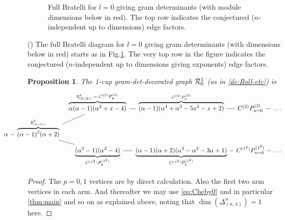 \documentclass{article}
\newcommand{\ppm}[1]{\textcolor{red}{#1}}
\newtheorem{proposition}[theorem]{Proposition}
\theoremstyle{definition}
\newcommand{\mdef}{\refstepcounter{theorem}       \medskip \noindent ({\bf \thetheorem}) }
\newcommand{\Deltaa}{\Delta}   %
\newcommand{\Deltaaa}[2]{\Deltaa^{#1}_{#2}}
\newcommand{\Deltt}{{\mathtt D}}   %
\newcommand{\Delttt}[2]{\Deltt^{#1}_{(#2)}}  %
\def\l{\lambda}
\numberwithin{equation}{subsection}
\begin{document}
\begin{figure}
    \caption{Full Bratelli for $l=0$ giving gram determinants (with module dimensions below in red). 
    The top row indicates the conjectured ($n$-independent up to dimensions) edge factors. }
    \label{fig:Bratelli-l0-gramdets}
\end{figure}




\mdef 
The full Bratelli diagram for $l=0$ giving gram determinants (with dimensions below in red) 
starts as in Fig.\ref{fig:Bratelli-l0-gramdets}. 
    The very top row in the figure indicates the conjectured ($n$-independent up to dimensions giving exponents) edge factors. 

\begin{proposition}\label{pr:1cupgram}
The 1-cup gram-det-decorated graph ${\mathcal{R}}^1_0$ (as in \ref{de:Roll-etc}) is   %
\[  \hspace{-1.5cm} 
\begin{tikzcd}[row sep=tiny,column sep=tiny]
&&  \overbrace{\alpha (\alpha-1)(\alpha^2 +x-4)}^{\Delttt{4}{2,(2)} \;=\; C^{(2)}P^{(2)}_4} \ar[r,dash] &
  \overbrace{(\alpha-1)(\alpha^4 +\alpha^3 -5x^2 -x+2)}^{C^{(2)}P^{(2)}_{5}} \ar[r,dash] &
  C^{(2)}P^{(2)}_{n=6} \ar[r,dash] & \dots
  \\
    \alpha \ar[r,dash] &
    \overbrace{
    (\alpha-1)^2 (\alpha+2)   }^{\Delttt{3}{1,(1)}  }   \ar[ur,dash]\ar[dr,dash]
    \\
    &&\underbrace{(\alpha^2 -1)(\alpha^2 -4)}_{C^{(1^2)}P^{(1^2)}_4} \ar[r,dash] &
    \underbrace{(\alpha-1)(\alpha+2)(\alpha^3 -\alpha^2 -3\alpha+1)}_{C^{(1^2)}P^{(1^2)}_5} \ar[r,dash] &
    C^{(1^2)}P^{(1^2)}_{n=6} \ar[r,dash] & \dots
\end{tikzcd}
\]
\end{proposition}
\begin{proof}
    The $p=0,1$ vertices are by direct calculation. Also the first two arm vertices in each arm. And thereafter we may use 
\ref{eq:Cheby0} and in particular \ref{thm:main} and so on as explained above, 
noting that $\dim(\Deltaaa{n}{(n,\l)}) = 1$ here. 
\end{proof}

\end{document}
